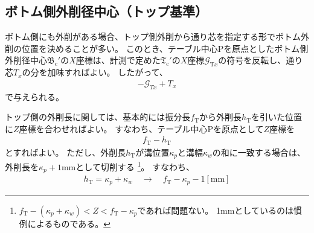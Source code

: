 \subsection{ボトム側外削径中心（トップ基準）}
ボトム側にも外削がある場合、トップ側外削から通り芯を指定する形でボトム外削の位置を決めることが多い。
このとき、テーブル中心Pを原点としたボトム側外削径中心$\mathfrak B_\mathrm c'$の$X$座標は、計測で定めた$\mathfrak T_\mathrm c'$の$X$座標$\mathcal G_{\mathrm Tx}$の符号を反転し、通り芯$T_x$の分を加味すればよい。
したがって、
\begin{align}
  \label{eq:TbasedTx}
  -\mathcal G_{Tx}+T_x
\end{align}
で与えられる。



\clearpage
トップ側の外削長に関しては、基本的には振分長$f_\mathrm T$から外削長$h_\mathrm T$を引いた位置に$Z$座標を合わせればよい。
すなわち、テーブル中心Pを原点として$Z$座標を
\begin{align*}
  f_\mathrm T - h_\mathrm T
\end{align*}
とすればよい。
ただし、外削長$h_\mathrm T$が溝位置$\kappa_p$と溝幅$\kappa_w$の和に一致する場合は、外削長を$\kappa_p+1$mmとして切削する
\footnote{$f_\mathrm T-(\kappa_p+\kappa_w) < Z < f_\mathrm T-\kappa_p$であれば問題ない。
1mmとしているのは慣例によるものである。}。
すなわち、
\begin{align*}
  h_\mathrm T = \kappa_p+\kappa_w \quad \longrightarrow \quad f_\mathrm T-\kappa_p-1[\mathrm{mm}]
\end{align*}






